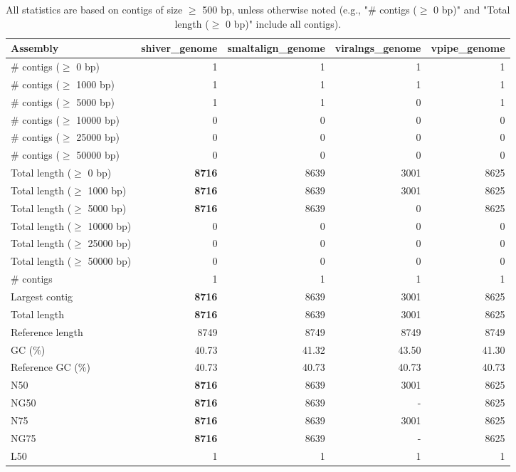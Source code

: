 \documentclass[12pt,a4paper]{article}
\begin{document}
\begin{table}[ht]
\begin{center}
\caption{All statistics are based on contigs of size $\geq$ 500 bp, unless otherwise noted (e.g., "\# contigs ($\geq$ 0 bp)" and "Total length ($\geq$ 0 bp)" include all contigs).}
\begin{tabular}{|l*{4}{|r}|}
\hline
Assembly & shiver\_genome & smaltalign\_genome & viralngs\_genome & vpipe\_genome \\ \hline
\# contigs ($\geq$ 0 bp) & 1 & 1 & 1 & 1 \\ \hline
\# contigs ($\geq$ 1000 bp) & 1 & 1 & 1 & 1 \\ \hline
\# contigs ($\geq$ 5000 bp) & 1 & 1 & 0 & 1 \\ \hline
\# contigs ($\geq$ 10000 bp) & 0 & 0 & 0 & 0 \\ \hline
\# contigs ($\geq$ 25000 bp) & 0 & 0 & 0 & 0 \\ \hline
\# contigs ($\geq$ 50000 bp) & 0 & 0 & 0 & 0 \\ \hline
Total length ($\geq$ 0 bp) & {\bf 8716} & 8639 & 3001 & 8625 \\ \hline
Total length ($\geq$ 1000 bp) & {\bf 8716} & 8639 & 3001 & 8625 \\ \hline
Total length ($\geq$ 5000 bp) & {\bf 8716} & 8639 & 0 & 8625 \\ \hline
Total length ($\geq$ 10000 bp) & 0 & 0 & 0 & 0 \\ \hline
Total length ($\geq$ 25000 bp) & 0 & 0 & 0 & 0 \\ \hline
Total length ($\geq$ 50000 bp) & 0 & 0 & 0 & 0 \\ \hline
\# contigs & 1 & 1 & 1 & 1 \\ \hline
Largest contig & {\bf 8716} & 8639 & 3001 & 8625 \\ \hline
Total length & {\bf 8716} & 8639 & 3001 & 8625 \\ \hline
Reference length & 8749 & 8749 & 8749 & 8749 \\ \hline
GC (\%) & 40.73 & 41.32 & 43.50 & 41.30 \\ \hline
Reference GC (\%) & 40.73 & 40.73 & 40.73 & 40.73 \\ \hline
N50 & {\bf 8716} & 8639 & 3001 & 8625 \\ \hline
NG50 & {\bf 8716} & 8639 & - & 8625 \\ \hline
N75 & {\bf 8716} & 8639 & 3001 & 8625 \\ \hline
NG75 & {\bf 8716} & 8639 & - & 8625 \\ \hline
L50 & 1 & 1 & 1 & 1 \\ \hline

\end{tabular}
\end{center}
\end{table}
\end{document}
